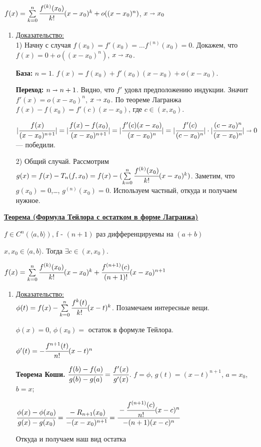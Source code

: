 \documentclass{article}
\newcommand{\thmm}[1]{\underline{\textbf{#1}}}
\newcommand{\prooff}[1]{{\underline{Доказательство:}} \\ }
\begin{document}
$f(x) = \sum\limits_{k=0}^n  \cfrac{f^{(k)}(x_0)}{k!}(x-x_0)^k + o((x-x_0)^n) $, $x\shortrightarrow x_0$

\begin{enumerate}
    \item[] \prooff{}
    1) Начну с случая $f(x_0) = f'(x_0) =\ldots f^{(n)}(x_0)=0$.  Докажем, что $f(x) = 0 + o((x-x_0)^n) $, $x \shortrightarrow x_0$.

    \textbf{База:} $n=1$. $f(x) = f(x_0) + f'(x_0)(x-x_0) + o(x-x_0)$.
    
    \textbf{Переход:}  $n \shortrightarrow n+1$. Видно, что $f'$ удовл предположению индукции. Значит $f'(x) = o(x-x_0)^{n}$, $x \shortrightarrow x_0$. По теореме Лагранжа $f(x) - f(x_0) = f'(c)(x-x_0)$, где $c \in (x, x_0)$.

    $|\cfrac{f(x)}{(x-x_0)^{n+1}}| = |\cfrac{f(x) - f(x_0)}{(x-x_0)^{n+1}}| = |\cfrac{ f'(c)(x-x_0)}{(x-x_0)^n}|= |\cfrac{f'(c)}{(c-x_0)^n}| \cdot |\cfrac{(c-x_0)^n}{(x-x_0)^n}| \shortrightarrow 0$ --- победили.

    2) Общий случай. Рассмотрим $g(x) = f(x) - T_n(f,x_0) = f(x) - (\sum\limits_{k=0}^n  \cfrac{f^{(k)}(x_0)}{k!}(x-x_0)^k)$. Заметим, что $g(x_0) = 0$,\ldots, $g^{(n)}(x_0)=0$. Используем частный, откуда и получаем нужное.

\end{enumerate}

\thmm{Теорема (Формула Тейлора с остатком в форме Лагранжа)}

$f \in C^n(\langle a,b \rangle )$, f - $(n+1)$ раз дифференцируемы на $(a+b)$


$x, x_0 \in \langle a,b\rangle$. Тогда $\exists c \in (x, x_0)$.

$f(x) = \sum\limits_{k=0}^n  \cfrac{f^{(k)}(x_0)}{k!}(x-x_0)^k + \cfrac{f^{(n+1)}(c)}{(n+1)!}(x-x_0)^{n+1} $
\begin{enumerate}
    \item[] \prooff{}

    $\phi(t) = f(x) - \sum\limits_{k=0}^n \cfrac{f^{k}(t)}{k!}(x-t)^k$. Позамечаем интересные вещи.

    $\phi(x) = 0$, $\phi(x_0) = $ остаток в формуле Тейлора.

    $\phi'(t) = - \cfrac{f^{n+1}(t)}{n!}(x-t)^n$

    \textbf{Теорема Коши.} $\cfrac{f(b)-f(a)}{g(b)-g(a) } = \cfrac{f'(x)}{g'(x)}$. $f = \phi$, $g(t) = (x-t)^{n+1}$, $a= x_0$, $b=x$;

    $\cfrac{\phi(x)-\phi(x_0)}{g(x)-g(x_0)} = \cfrac{-R_{n+1}(x_0)}{-(x-x_0)^{n+1}} = \cfrac{-\cfrac{f^{(n+1)}(c)}{n!} (x-c)^n}{-(n+1) (x-c)^n}$

    Откуда и получаем наш вид остатка
\end{enumerate}
\end{document}
